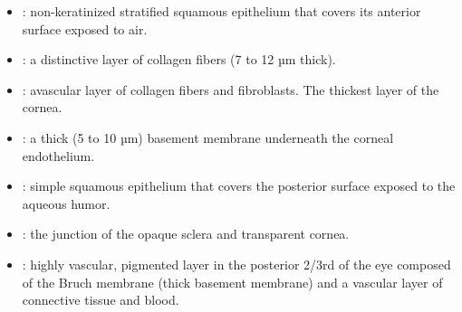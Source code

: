 \begin{multicols}{2}
\begin{itemize}
  \begin{center}
  \end{center}
  
  \item {}: non-keratinized stratified squamous epithelium that covers its anterior surface exposed to air. 
  
  \begin{center}
  \end{center}
  
  \item {}:  a distinctive layer of collagen fibers (7 to 12 µm thick).
  
  \begin{center}
  \end{center}
  
  \item {}: avascular layer of collagen fibers and fibroblasts. The thickest layer of the cornea.
  
  \begin{center}
  \end{center}
  
  \item {}:  a thick (5 to 10 µm) basement membrane underneath the corneal endothelium.
  
  \begin{center}
  \end{center}
  
  \item {}: simple squamous epithelium that covers the posterior surface exposed to the aqueous humor.
  
  \begin{center}
  \end{center}
   
  \item {}: the junction of the opaque sclera and transparent cornea.
  
  \begin{center}
  \end{center}

  \item {}: highly vascular, pigmented layer in the posterior 2/3rd of the eye composed of the Bruch membrane (thick basement membrane) and a vascular layer of connective tissue and blood.  
  \begin{center}
  \end{center}
  

\end{itemize}
\end{multicols}
